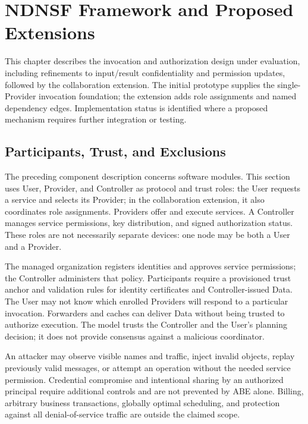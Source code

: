\chapter{NDNSF Framework and Proposed Extensions}
\label{chap:ndnsf}
This chapter describes the invocation and authorization design under evaluation, including refinements to input/result confidentiality and permission updates, followed by the collaboration extension. The initial prototype supplies the single-Provider invocation foundation; the extension adds role assignments and named dependency edges. Implementation status is identified where a proposed mechanism requires further integration or testing.



\section{Participants, Trust, and Exclusions}
The preceding component description concerns software modules. This section uses User, Provider, and Controller as protocol and trust roles: the User requests a service and selects its Provider; in the collaboration extension, it also coordinates role assignments. Providers offer and execute services. A Controller manages service permissions, key distribution, and signed authorization status. These roles are not necessarily separate devices: one node may be both a User and a Provider.

The managed organization registers identities and approves service permissions; the Controller administers that policy. Participants require a provisioned trust anchor and validation rules for identity certificates and Controller-issued Data. The User may not know which enrolled Providers will respond to a particular invocation. Forwarders and caches can deliver Data without being trusted to authorize execution. The model trusts the Controller and the User's planning decision; it does not provide consensus against a malicious coordinator.

An attacker may observe visible names and traffic, inject invalid objects, replay previously valid messages, or attempt an operation without the needed service permission. Credential compromise and intentional sharing by an authorized principal require additional controls and are not prevented by ABE alone. Billing, arbitrary business transactions, globally optimal scheduling, and protection against all denial-of-service traffic are outside the claimed scope.


